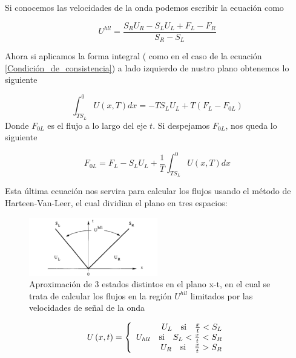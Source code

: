 \documentclass[12pt,a4paper]{book}
\begin{document}
Si conocemos las velocidades de la onda podemos escribir la ecuación como 

\begin{equation}\label{u_hll}
U^{hll} = \frac{S_R U_R - S_L U_L + F_L - F_R}{S_R - S_L}
\end{equation}

Ahora si aplicamos la forma integral ( como en el caso de la ecuación \ref{Condición_de_consistencia}) a lado izquierdo de nustro plano obtenemos lo siguiente

\begin{equation}
\int_{T S_L}^{0} U\left( x, T \right) dx = 
-T S_L U_L+T \left( F_L- F_{0L} \right)
\end{equation}
Donde $F_{0L}$ es el flujo a lo largo del eje $t$. Si despejamos $F_{0L}$, nos queda lo siguiente

\begin{equation}\label{ec F_0L}
F_{0L} = F_L - S_L U_L + \frac{1}{T}  \int_{T S_L}^{0} U\left( x, T \right) dx
\end{equation}

Esta última ecuación nos servira para calcular los flujos usando el método de Harteen-Van-Leer, el cual dividian el plano en tres espacios:

\begin{figure} %
  \centering
    \includegraphics[width=0.5\textwidth]{Figuras/HLL.png}
  \caption{Aproximación de 3 estados distintos en el plano x-t, en el cual se trata de calcular los flujos en la región $U^{hll}$ limitados por las velocidades de señal de la onda}
  \label{fig:HLL}
\end{figure}

\begin{equation}
U \left(x,t \right) = 
\left\lbrace
\begin{array}{rr}
U_L \quad \textup{si} \quad \frac{x}{t}< S_L  \\
U_{hll} \quad \textup{si} \quad S_L< \frac{x}{t} <S_R \\
U_R \quad \textup{si} \quad  \frac{x}{t} > S_R
\end{array}
\right.
\end{equation}
\end{document}

